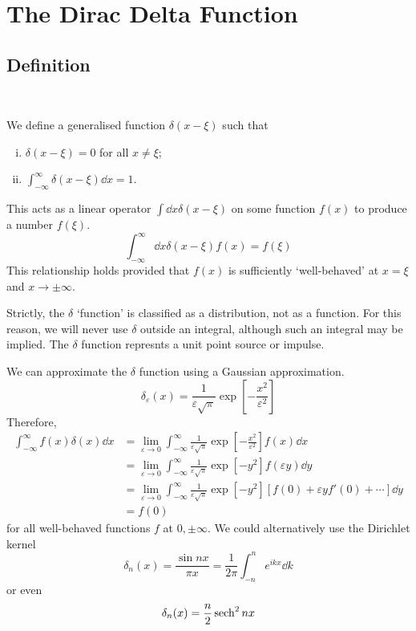 \documentclass[a4paper]{article}
\begin{document}
\section{The Dirac Delta Function}
\subsection{Definition}\ \vspace*{-1.5em}
\begin{definition}
	We define a generalised function \( \delta(x - \xi) \) such that
	\begin{enumerate}[(i)]
		\item \( \delta(x-\xi) = 0 \) for all \( x \neq \xi \);
		\item \( \int_{-\infty}^\infty \delta(x-\xi) \dd{x} = 1 \).
	\end{enumerate}
	This acts as a linear operator \( \int \dd{x} \delta(x - \xi) \) on some function \( f(x) \) to produce a number \( f(\xi) \).
	\[
		\int_{-\infty}^\infty \dd{x} \delta(x-\xi) f(x) = f(\xi)
	\]
	This relationship holds provided that \( f(x) \) is sufficiently `well-behaved' at \( x=\xi \) and \( x\to\pm \infty \).
\end{definition}

\begin{remark}
	Strictly, the \( \delta \) `function' is classified as a distribution, not as a function.
	For this reason, we will never use \( \delta \) outside an integral, although such an integral may be implied.
	The \( \delta \) function represnts a unit point source or impulse.
\end{remark}

We can approximate the \( \delta \) function using a Gaussian approximation.
\[
	\delta_\varepsilon(x) = \frac{1}{\varepsilon \sqrt{\pi}} \exp[-\frac{x^2}{\varepsilon^2}]
\]
Therefore,
\begin{align*}
	\int_{-\infty}^\infty f(x) \delta(x) \dd{x} & = \lim_{\varepsilon \to 0} \int_{-\infty}^\infty \frac{1}{\varepsilon \sqrt{\pi}} \exp[-\frac{x^2}{\varepsilon^2}] f(x) \dd{x}            \\
	                                            & = \lim_{\varepsilon \to 0} \int_{-\infty}^\infty \frac{1}{\varepsilon \sqrt{\pi}} \exp[-y^2] f(\varepsilon y) \dd{y}                      \\
	                                            & = \lim_{\varepsilon \to 0} \int_{-\infty}^\infty \frac{1}{\varepsilon \sqrt{\pi}} \exp[-y^2] [f(0) + \varepsilon y f'(0) + \cdots] \dd{y} \\
	                                            & = f(0)
\end{align*}
for all well-behaved functions \( f \) at \( 0, \pm \infty \).
We could alternatively use the Dirichlet kernel
\[
	\delta_n(x) = \frac{\sin n x}{\pi x} = \frac{1}{2\pi} \int_{-n}^n e^{ikx} \dd{k}
\]
or even
\[
	\delta_n(x) = \frac{n}{2} \sech^2 nx
\]
\end{document}
